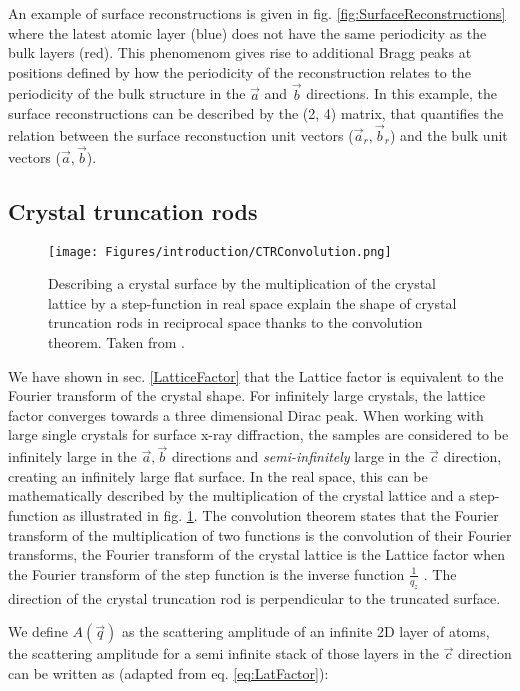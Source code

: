 An example of surface reconstructions is given in fig. \ref{fig:SurfaceReconstructions} where the latest atomic layer (blue) does not have the same periodicity as the bulk layers (red).
This phenomenom gives rise to additional Bragg peaks at positions defined by how the periodicity of the reconstruction relates to the periodicity of the bulk structure in the $\vec{a}$ and $\vec{b}$ directions.
In this example, the surface reconstructions can be described by the (2, 4) matrix, that quantifies the relation between the surface reconstuction unit vectors ($\vec{a}_r, \vec{b}_r$) and the bulk unit vectors ($\vec{a}, \vec{b}$).

\subsection{Crystal truncation rods}

\begin{figure}[!htb]
    \centering
    \texttt{[image: Figures/introduction/CTRConvolution.png]}
    \caption{
    Describing a crystal surface by the multiplication of the crystal lattice by a step-function in real space explain the shape of crystal truncation rods in reciprocal space thanks to the convolution theorem.
    Taken from \cite{Willmott}.
    }
    \label{fig:CTRConvolution}
\end{figure}

We have shown in sec. \ref{LatticeFactor} that the Lattice factor is equivalent to the Fourier transform of the crystal shape.
For infinitely large crystals, the lattice factor converges towards a three dimensional Dirac peak.
When working with large single crystals for surface x-ray diffraction, the samples are considered to be infinitely large in the $\vec{a}, \vec{b}$ directions and \textit{semi-infinitely} large in the $\vec{c}$ direction, creating an infinitely large flat surface.
In the real space, this can be mathematically described by the multiplication of the crystal lattice and a step-function as illustrated in fig. \ref{fig:CTRConvolution}.
The convolution theorem states that the Fourier transform of the multiplication of two functions is the convolution of their Fourier transforms, the Fourier transform of the crystal lattice is the Lattice factor when the Fourier transform of the step function is the inverse function $\frac{1}{q_z}$ \parencite{Andrews1985, Robinson1986}.
The direction of the crystal truncation rod is perpendicular to the truncated surface.

We define $A(\vec{q})$ as the scattering amplitude of an infinite 2D layer of atoms, the scattering amplitude for a semi infinite stack of those layers in the $\vec{c}$ direction can be written as (adapted from eq. \ref{eq:LatFactor}):


